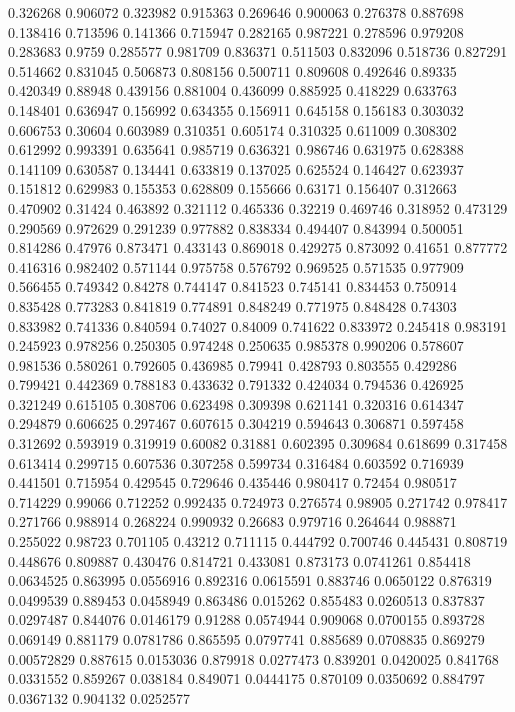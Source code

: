 0.326268 0.906072
0.323982 0.915363
0.269646 0.900063
0.276378 0.887698
0.138416 0.713596
0.141366 0.715947
0.282165 0.987221
0.278596 0.979208
0.283683 0.9759
0.285577 0.981709
0.836371 0.511503
0.832096 0.518736
0.827291 0.514662
0.831045 0.506873
0.808156 0.500711
0.809608 0.492646
0.89335 0.420349
0.88948 0.439156
0.881004 0.436099
0.885925 0.418229
0.633763 0.148401
0.636947 0.156992
0.634355 0.156911
0.645158 0.156183
0.303032 0.606753
0.30604 0.603989
0.310351 0.605174
0.310325 0.611009
0.308302 0.612992
0.993391 0.635641
0.985719 0.636321
0.986746 0.631975
0.628388 0.141109
0.630587 0.134441
0.633819 0.137025
0.625524 0.146427
0.623937 0.151812
0.629983 0.155353
0.628809 0.155666
0.63171 0.156407
0.312663 0.470902
0.31424 0.463892
0.321112 0.465336
0.32219 0.469746
0.318952 0.473129
0.290569 0.972629
0.291239 0.977882
0.838334 0.494407
0.843994 0.500051
0.814286 0.47976
0.873471 0.433143
0.869018 0.429275
0.873092 0.41651
0.877772 0.416316
0.982402 0.571144
0.975758 0.576792
0.969525 0.571535
0.977909 0.566455
0.749342 0.84278
0.744147 0.841523
0.745141 0.834453
0.750914 0.835428
0.773283 0.841819
0.774891 0.848249
0.771975 0.848428
0.74303 0.833982
0.741336 0.840594
0.74027 0.84009
0.741622 0.833972
0.245418 0.983191
0.245923 0.978256
0.250305 0.974248
0.250635 0.985378
0.990206 0.578607
0.981536 0.580261
0.792605 0.436985
0.79941 0.428793
0.803555 0.429286
0.799421 0.442369
0.788183 0.433632
0.791332 0.424034
0.794536 0.426925
0.321249 0.615105
0.308706 0.623498
0.309398 0.621141
0.320316 0.614347
0.294879 0.606625
0.297467 0.607615
0.304219 0.594643
0.306871 0.597458
0.312692 0.593919
0.319919 0.60082
0.31881 0.602395
0.309684 0.618699
0.317458 0.613414
0.299715 0.607536
0.307258 0.599734
0.316484 0.603592
0.716939 0.441501
0.715954 0.429545
0.729646 0.435446
0.980417 0.72454
0.980517 0.714229
0.99066 0.712252
0.992435 0.724973
0.276574 0.98905
0.271742 0.978417
0.271766 0.988914
0.268224 0.990932
0.26683 0.979716
0.264644 0.988871
0.255022 0.98723
0.701105 0.43212
0.711115 0.444792
0.700746 0.445431
0.808719 0.448676
0.809887 0.430476
0.814721 0.433081
0.873173 0.0741261
0.854418 0.0634525
0.863995 0.0556916
0.892316 0.0615591
0.883746 0.0650122
0.876319 0.0499539
0.889453 0.0458949
0.863486 0.015262
0.855483 0.0260513
0.837837 0.0297487
0.844076 0.0146179
0.91288 0.0574944
0.909068 0.0700155
0.893728 0.069149
0.881179 0.0781786
0.865595 0.0797741
0.885689 0.0708835
0.869279 0.00572829
0.887615 0.0153036
0.879918 0.0277473
0.839201 0.0420025
0.841768 0.0331552
0.859267 0.038184
0.849071 0.0444175
0.870109 0.0350692
0.884797 0.0367132
0.904132 0.0252577
